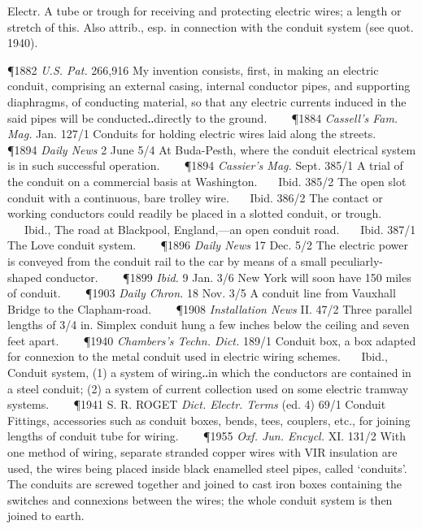\begin{description}[wide, labelwidth=!, labelindent=0pt]
\begin{myenumerate}
 Electr. A tube or trough for receiving and protecting electric wires; a length or stretch of this. Also attrib., esp. in connection with the conduit system (see quot. 1940).

\P 1882 \textit{U.S.  Pat.} 266,916 My invention consists, first, in making an electric conduit, comprising an external casing, internal conductor pipes, and supporting diaphragms, of conducting material, so that any electric currents induced in the said pipes will be conducted‥directly to the ground.    
\P 1884 \textit{Cassell's  Fam. Mag.} Jan. 127/1 Conduits for holding electric wires laid along the streets.    
\P 1894  \textit{Daily News} 2 June 5/4 At Buda-Pesth, where the conduit electrical system is in such successful operation.    
\P 1894 \textit{Cassier's  Mag.} Sept. 385/1 A trial of the conduit on a commercial basis at Washington.    Ibid. 385/2 The open slot conduit with a continuous, bare trolley wire.    Ibid. 386/2 The contact or working conductors could readily be placed in a slotted conduit, or trough.    Ibid., The road at Blackpool, England,—an open conduit road.    Ibid. 387/1 The Love conduit system.    
\P 1896  \textit{Daily News} 17 Dec. 5/2 The electric power is conveyed from the conduit rail to the car by means of a small peculiarly-shaped conductor.    
\P 1899  \textit{Ibid.} 9 Jan. 3/6 New York will soon have 150 miles of conduit.    
\P 1903  \textit{Daily Chron.} 18 Nov. 3/5 A conduit line from Vauxhall Bridge to the Clapham-road.    
\P 1908 \textit{Installation  News} II. 47/2 Three parallel lengths of 3/4 in. Simplex conduit hung a few inches below the ceiling and seven feet apart.    
\P 1940  \textit{Chambers's Techn. Dict.} 189/1 Conduit box, a box adapted for connexion to the metal conduit used in electric wiring schemes.    Ibid., Conduit system, (1) a system of wiring‥in which the conductors are contained in a steel conduit; (2) a system of current collection used on some electric tramway systems.    
\P 1941 S. R. ROGET  \textit{Dict. Electr. Terms} (ed. 4) 69/1 Conduit Fittings, accessories such as conduit boxes, bends, tees, couplers, etc., for joining lengths of conduit tube for wiring.    
\P 1955 \textit{Oxf.  Jun. Encycl.} XI. 131/2 With one method of wiring, separate stranded copper wires with VIR insulation are used, the wires being placed inside black enamelled steel pipes, called ‘conduits’. The conduits are screwed together and joined to cast iron boxes containing the switches and connexions between the wires; the whole conduit system is then joined to earth.


\end{myenumerate}
\end{description}
